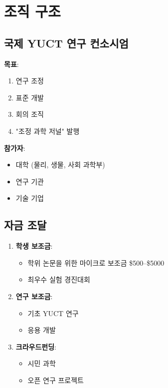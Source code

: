 \documentclass[12pt,a4paper]{article}
\begin{document}
	\section{조직 구조}
	
	\subsection{국제 YUCT 연구 컨소시엄}
	
	\textbf{목표}:
	\begin{enumerate}
		\item 연구 조정
		\item 표준 개발
		\item 회의 조직
		\item "조정 과학 저널" 발행
	\end{enumerate}
	
	\textbf{참가자}:
	\begin{itemize}
		\item 대학 (물리, 생물, 사회 과학부)
		\item 연구 기관
		\item 기술 기업
	\end{itemize}
	
	\subsection{자금 조달}
	
	\begin{enumerate}
		\item \textbf{학생 보조금}:
		\begin{itemize}
			\item 학위 논문을 위한 마이크로 보조금 \$500–\$5000
			\item 최우수 실험 경진대회
		\end{itemize}
		
		\item \textbf{연구 보조금}:
		\begin{itemize}
			\item 기초 YUCT 연구
			\item 응용 개발
		\end{itemize}
		
		\item \textbf{크라우드펀딩}:
		\begin{itemize}
			\item 시민 과학
			\item 오픈 연구 프로젝트
		\end{itemize}
	\end{enumerate}
	
\end{document}
